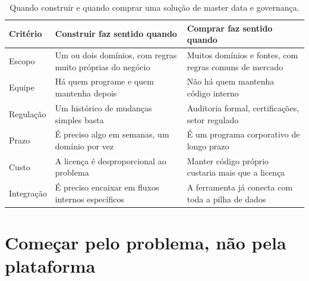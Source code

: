 \begin{table}[htbp]
  \centering
  \caption{Quando construir e quando comprar uma solução de master data e governança.}
  \label{tab:construir-comprar}
  \small
  \begin{tabularx}{\textwidth}{@{}>{\raggedright\arraybackslash}p{}
      >{\raggedright\arraybackslash}X>{\raggedright\arraybackslash}X@{}}
    \toprule
    Critério & Construir faz sentido quando & Comprar faz sentido quando \\
    \midrule
    Escopo & Um ou dois domínios, com regras muito próprias do negócio & Muitos domínios e fontes, com regras comuns de mercado \\
    \addlinespace
    Equipe & Há quem programe e quem mantenha depois & Não há quem mantenha código interno \\
    \addlinespace
    Regulação & Um histórico de mudanças simples basta & Auditoria formal, certificações, setor regulado \\
    \addlinespace
    Prazo & É preciso algo em semanas, um domínio por vez & É um programa corporativo de longo prazo \\
    \addlinespace
    Custo & A licença é desproporcional ao problema & Manter código próprio custaria mais que a licença \\
    \addlinespace
    Integração & É preciso encaixar em fluxos internos específicos & A ferramenta já conecta com toda a pilha de dados \\
    \bottomrule
  \end{tabularx}
\end{table}

\section{Começar pelo problema, não pela plataforma}
\label{sec:comecar-pequeno}


